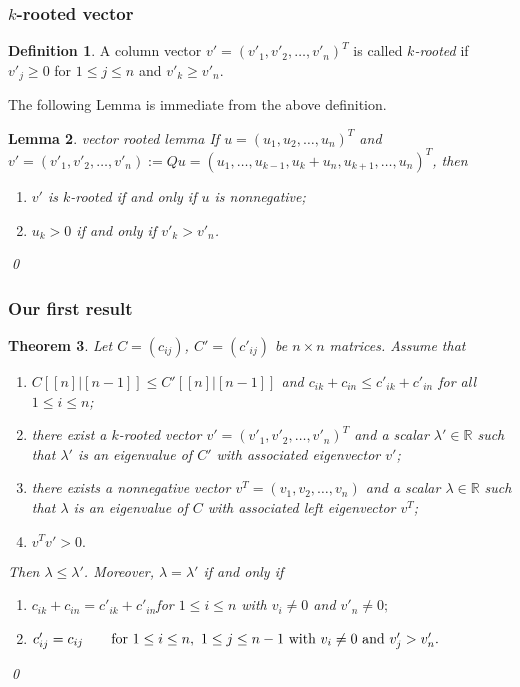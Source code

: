 \documentclass[]{beamer}
\theoremstyle{plain}
\newtheorem{thm}{Theorem}[section]
\newtheorem{lem}[thm]{Lemma}
\theoremstyle{definition}
\newtheorem{defn}[thm]{Definition}
\begin{document}
\begin{frame}
    \frametitle{ $k$-rooted vector}

\begin{defn}
 A column vector $v'=(v'_1,v'_2,\ldots,v'_n)^T$ is called {\it $k$-rooted}  if $v'_{j} \geq 0$ for $1 \leq  j \leq n$ and $v'_k\geq v'_n.$
\end{defn}
\bigskip

The following Lemma is immediate from the above definition.
\bigskip

\begin{lem}{vector rooted lemma}
If $u=(u_1, u_2, \ldots, u_n)^T$ and $v'=(v'_1, v'_2, \ldots, v'_n):=Qu=(u_1,\ldots, u_{k-1},u_k+u_n, u_{k+1}, \ldots,  u_n)^T$, then
\begin{enumerate}
\item[(i)] $v'$ is $k$-rooted  if and only if  $u$ is nonnegative;
\item[(ii)] $u_k>0$ if and only if $v'_k>v'_n$.
\end{enumerate}
\qed
\end{lem}

\end{frame}

\begin{frame}
    \frametitle{ Our first result}

\begin{thm} \label{thm_main}
    Let $C=(c_{ij})$, $C'=(c'_{ij})$ be  $n\times n$ matrices.
Assume that
\begin{enumerate}
\item[(i)]   $C[[n]|[n-1]]\leq C'[[n]|[n-1]]$ and $c_{ik}+c_{in}\leq c'_{ik}+c'_{in}$ for all $1\leq i\leq n$;
\item[(ii)] there exist a $k$-rooted vector $v'=(v'_1, v'_2, \ldots, v'_n)^T$ and a scalar $\lambda'\in \mathbb{R}$
such that $\lambda'$ is an eigenvalue of $C'$ with associated eigenvector $v'$;
\item[(iii)] there exists a nonnegative vector $v^T=(v_1, v_2, \ldots, v_n)$ and a scalar $\lambda\in \mathbb{R}$ such that $\lambda$ is an eigenvalue of $C$ with associated left eigenvector $v^T$;
\item[(iv)] $v^Tv'>0.$
\end{enumerate}
 Then $\lambda\leq \lambda'$.
Moreover, $\lambda=\lambda'$
if and only if
\begin{enumerate}
\item[(a)] $c_{ik}+c_{in}=c'_{ik}+c'_{in}$\qquad for $1\leq i\leq n$ with $v_i\not=0$ and $v'_n\not=0;$
\item[(b)]
$c'_{ij}=c_{ij}\qquad \hbox{for~}1\leq i\leq n,~1\leq j\leq n-1 \hbox{~with~} v_i\ne 0 \hbox{~and~} v'_j> v'_n.$
\end{enumerate} \qed
\end{thm}
\end{frame}
\end{document}
